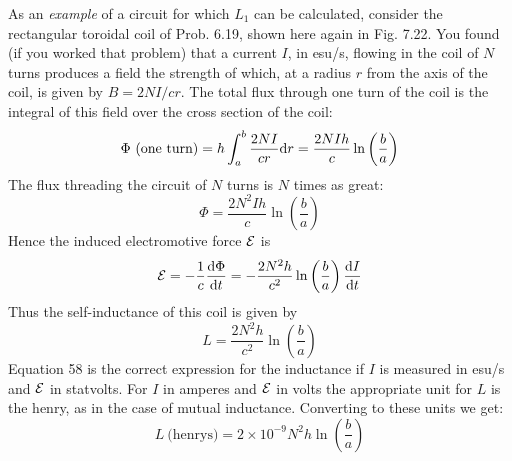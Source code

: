 As an \emph{example} of a circuit for which $L_1$ can be calculated, consider
the rectangular toroidal coil of Prob. 6.19, shown here again in
Fig. 7.22. You found (if you worked that problem) that a current $I$,
in esu/s, flowing in the coil of $N$ turns produces a field the strength
of which, at a radius $r$ from the axis of the coil, is given by $B = 2NI/cr$.
The total flux through one turn of the coil is the integral of this field
over the cross section of the coil:
\begin{equation}
  \Phi\ \text{(one turn)} = h\int_a^b \frac{2NI}{cr}\textup{d} r = \frac{2NIh}{c}\ln\left(\frac{b}{a}\right)
\end{equation}
The flux threading the circuit of $N$ turns is $N$ times as great:
\begin{equation}
  \Phi = \frac{2N^2Ih}{c}\ln\left(\frac{b}{a}\right)
\end{equation}
Hence the induced electromotive force $\mathcal{E}$ is
\begin{equation}
  \mathcal{E} = -\frac{1}{c}\frac{\textup{d}\Phi}{\textup{d} t} = -\frac{2N^2h}{c^2}\ln\left(\frac{b}{a}\right)\frac{\textup{d} I}{\textup{d} t}
\end{equation}
Thus the self-inductance of this coil is given by
\begin{equation}
  L = \frac{2N^2h}{c^2}\ln\left(\frac{b}{a}\right)
\end{equation}
Equation 58 is the correct expression for the inductance if $I$ is measured
in esu/s and $\mathcal{E}$ in statvolts. For $I$ in amperes and $\mathcal{E}$ in volts
the appropriate unit for $L$ is the henry, as in the case of mutual 
inductance. Converting to these units we get:
\begin{equation}
  L\ \text{(henrys)} = 2 \times 10^{-9} N^2 h \ln\left(\frac{b}{a}\right)
\end{equation}


